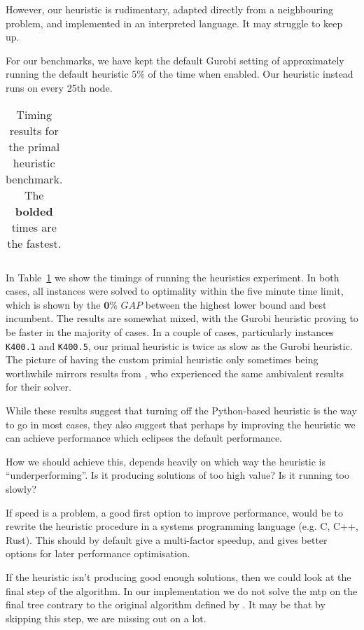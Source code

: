 However, our heuristic is rudimentary, adapted directly from a neighbouring problem,
and implemented in an interpreted language. It may struggle to keep up.

For our benchmarks, we have kept the default Gurobi setting of approximately running
the default heuristic $5\%$ of the time when enabled. Our heuristic instead runs on
every 25th node.

\begin{table}[h!]
  \centering
  \begin{tabular}[h!]{|c|c|c|c|c|}\hline
    
  \end{tabular}
  \caption{Timing results for the primal heuristic benchmark. The
    \textbf{bolded} times are the fastest.}
  \label{tab:jmp:heuristics}
\end{table}

In Table~\ref{tab:jmp:heuristics} we show the timings of running the heuristics experiment.
In both cases, all instances were solved to optimality within the five minute time limit, which
is shown by the $\mathbf{0\%}$ $GAP$ between the highest lower bound and best incumbent.
The results are somewhat mixed, with the Gurobi heuristic proving to be faster in the majority
of cases. In a couple of cases, particularly instances \texttt{K400.1} and \texttt{K400.5},
our primal heuristic is twice as slow as the Gurobi heuristic. The picture of having the
custom primial heuristic only sometimes being worthwhile mirrors results from
\citet{ljubic2005solving}, who experienced the same ambivalent results for their solver.

While these results suggest that turning off the Python-based heuristic is the way to go
in most cases,
they also suggest that perhaps by improving the heuristic we can achieve performance
which eclipses the default performance.

How we should achieve this, depends heavily on which way the heuristic is ``underperforming''.
 Is it producing solutions of too high value? Is it running too slowly?

 If speed is a problem, a good first option to improve performance,
 would be to rewrite the heuristic procedure
in a systems programming language (e.g. C, C++, Rust).
This should by default give a multi-factor speedup, and gives better options for
later performance optimisation.

If the heuristic isn't producing good enough solutions, then we could look at the final step
of the algorithm. In our implementation we do not solve the \gls{mtp} on the final tree contrary
to the original algorithm defined by \citet{ljubic2005solving}. It may be that by skipping
this step, we are missing out on a lot.

